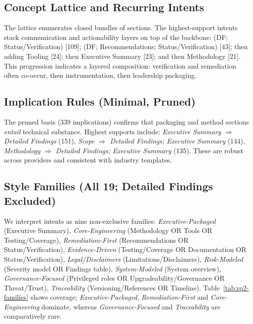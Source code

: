 \subsection{Concept Lattice and Recurring Intents}
The lattice enumerates closed bundles of sections. The highest-support intents stack communication and actionability layers on top of the backbone: (DF; Status/Verification) [109]; (DF; Recommendations; Status/Verification) [43]; then adding Tooling [24]; then Executive Summary [23]; and then Methodology [21]. This progression indicates a layered composition: verification and remediation often co-occur, then instrumentation, then leadership packaging.

\subsection{Implication Rules (Minimal, Pruned)}
The pruned basis (339 implications) confirms that packaging and method sections \emph{entail} technical substance. Highest supports include: \emph{Executive Summary $\Rightarrow$ Detailed Findings} (151), \emph{Scope $\Rightarrow$ Detailed Findings; Executive Summary} (144), \emph{Methodology $\Rightarrow$ Detailed Findings; Executive Summary} (135). These are robust across providers and consistent with industry templates.

\subsection{Style Families (All 19; Detailed Findings Excluded)}
We interpret intents as nine non-exclusive families:
\emph{Executive-Packaged} (Executive Summary),
\emph{Core-Engineering} (Methodology OR Tools OR Testing/Coverage),
\emph{Remediation-First} (Recommendations OR Status/Verification),
\emph{Evidence-Driven} (Testing/Coverage OR Documentation OR Status/Verification),
\emph{Legal/Disclaimers} (Limitations/Disclaimers),
\emph{Risk-Modeled} (Severity model OR Findings table),
\emph{System-Modeled} (System overview),
\emph{Governance-Focused} (Privileged roles OR Upgradeability/Governance OR Threat/Trust),
\emph{Traceability} (Versioning/References OR Timeline).
Table~\ref{tab:rq2-families} shows coverage; \emph{Executive-Packaged}, \emph{Remediation-First} and \emph{Core-Engineering}
dominate, whereas \emph{Governance-Focused} and \emph{Traceability} are comparatively rare.


